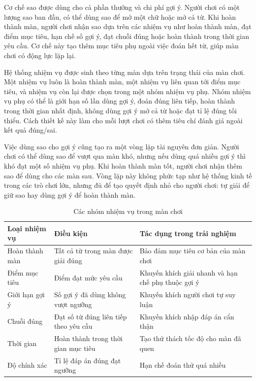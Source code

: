 \documentclass[../DoAn.tex]{subfiles}
\begin{document}
Cơ chế sao được dùng cho cả phần thưởng và chi phí gợi ý. Người chơi có một lượng sao ban đầu, có thể dùng sao để mở một chữ hoặc mở cả từ. Khi hoàn thành màn, người chơi nhận sao dựa trên các nhiệm vụ như hoàn thành màn, đạt điểm mục tiêu, hạn chế số gợi ý, đạt chuỗi đúng hoặc hoàn thành trong thời gian yêu cầu. Cơ chế này tạo thêm mục tiêu phụ ngoài việc đoán hết từ, giúp màn chơi có động lực lặp lại.

Hệ thống nhiệm vụ được sinh theo từng màn dựa trên trạng thái của màn chơi. Một nhiệm vụ luôn là hoàn thành màn, một nhiệm vụ liên quan tới điểm mục tiêu, và nhiệm vụ còn lại được chọn trong một nhóm nhiệm vụ phụ. Nhóm nhiệm vụ phụ có thể là giới hạn số lần dùng gợi ý, đoán đúng liên tiếp, hoàn thành trong thời gian nhất định, không dùng gợi ý mở cả từ hoặc đạt tỉ lệ đúng tối thiểu. Cách thiết kế này làm cho mỗi lượt chơi có thêm tiêu chí đánh giá ngoài kết quả đúng/sai.

Việc dùng sao cho gợi ý cũng tạo ra một vòng lặp tài nguyên đơn giản. Người chơi có thể dùng sao để vượt qua màn khó, nhưng nếu dùng quá nhiều gợi ý thì khó đạt một số nhiệm vụ phụ. Khi hoàn thành màn tốt, người chơi nhận thêm sao để dùng cho các màn sau. Vòng lặp này không phức tạp như hệ thống kinh tế trong các trò chơi lớn, nhưng đủ để tạo quyết định nhỏ cho người chơi: tự giải để giữ sao hay dùng gợi ý để hoàn thành màn.

\begin{table}[H]
\centering
\begin{tabularx}{\textwidth}{|>{\RaggedRight\arraybackslash}p{3.8cm}|>{\RaggedRight\arraybackslash}p{4.2cm}|>{\RaggedRight\arraybackslash}X|}
\hline
\textbf{Loại nhiệm vụ} & \textbf{Điều kiện} & \textbf{Tác dụng trong trải nghiệm} \\ \hline
Hoàn thành màn & Tất cả từ trong màn được giải đúng & Bảo đảm mục tiêu cơ bản của màn chơi \\ \hline
Điểm mục tiêu & Điểm đạt mức yêu cầu & Khuyến khích giải nhanh và hạn chế phụ thuộc gợi ý \\ \hline
Giới hạn gợi ý & Số gợi ý đã dùng không vượt ngưỡng & Khuyến khích người chơi tự suy luận \\ \hline
Chuỗi đúng & Đạt số từ đúng liên tiếp theo yêu cầu & Khuyến khích nhập đáp án cẩn thận \\ \hline
Thời gian & Hoàn thành trong thời gian mục tiêu & Tạo thử thách tốc độ cho màn đã quen \\ \hline
Độ chính xác & Tỉ lệ đáp án đúng đạt ngưỡng & Hạn chế đoán thử quá nhiều \\ \hline
\end{tabularx}
\caption{Các nhóm nhiệm vụ trong màn chơi}
\label{table:mission_types}
\end{table}
\end{document}
